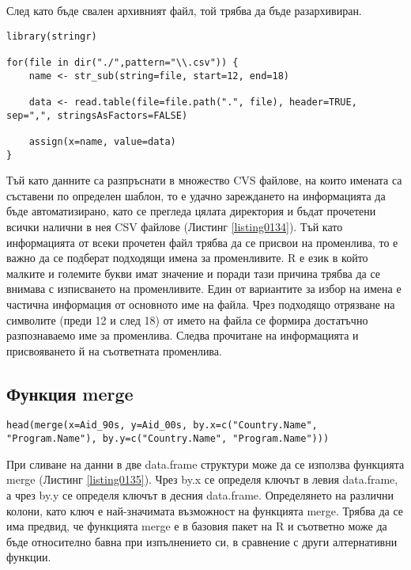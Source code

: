 След като бъде свален архивният файл, той трябва да бъде разархивиран. 

\begin{lstlisting}[caption=Зареждане USAID данните в R, label=listing0134]
library(stringr)

for(file in dir("./",pattern="\\.csv")) {
	name <- str_sub(string=file, start=12, end=18)

	data <- read.table(file=file.path(".", file), header=TRUE, sep=",", stringsAsFactors=FALSE)

	assign(x=name, value=data)
}
\end{lstlisting}

Тъй като данните са разпръснати в множество CVS файлове, на които имената са съставени по определен шаблон, то е удачно зареждането на информацията да бъде автоматизирано, като се прегледа цялата директория и бъдат прочетени всички налични в нея CSV файлове (Листинг \ref{listing0134}). Тъй като информацията от всеки прочетен файл трябва да се присвои на променлива, то е важно да се подберат подходящи имена за променливите. R е език в който малките и големите букви имат значение и поради тази причина трябва да се внимава с изписването на променливите. Един от вариантите за избор на имена е частична информация от основното име на файла. Чрез подходящо отрязване на символите (преди 12 и след 18) от името на файла се формира достатъчно разпознаваемо име за променлива. Следва прочитане на информацията и присвояването й на съответната променлива. 

\subsection{Функция merge}

\begin{lstlisting}[caption=Сливане на данни с merge, label=listing0135]
head(merge(x=Aid_90s, y=Aid_00s, by.x=c("Country.Name", "Program.Name"), by.y=c("Country.Name", "Program.Name")))
\end{lstlisting}

При сливане на данни в две data.frame структури може да се използва функцията merge (Листинг \ref{listing0135}). Чрез by.x се определя ключът в левия data.frame, а чрез by.y се определя ключът в десния data.frame. Определянето на различни колони, като ключ е най-значимата възможност на функцията merge. Трябва да се има предвид, че функцията merge е в базовия пакет на R и съответно може да бъде относително бавна при изпълнението си, в сравнение с други алтернативни функции. 

